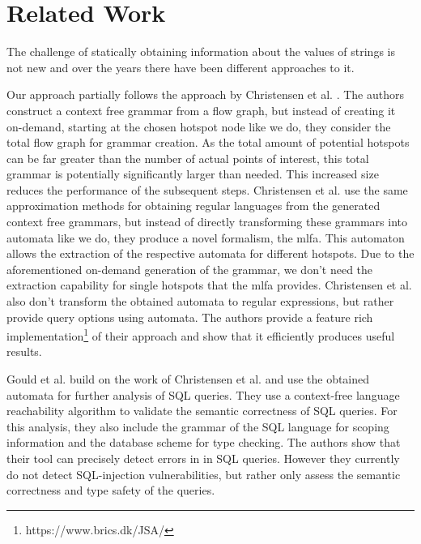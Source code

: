 \chapter{Related Work}
\label{chapter:RelatedWork}

The challenge of statically obtaining information about the values of strings is not new and over the years there have been different approaches to it.

Our approach partially follows the approach by Christensen et al. \cite{brics}. The authors construct a context free grammar from a flow graph, but instead of creating it on-demand, starting at the chosen hotspot node like we do, they consider the total flow graph for grammar creation.
As the total amount of potential hotspots can be far greater than the number of actual points of interest, this total grammar is potentially significantly larger than needed. This increased size reduces the performance of the subsequent steps.
Christensen et al. use the same approximation methods for obtaining regular languages from the generated context free grammars, but instead of directly transforming these grammars into automata like we do, they produce a novel formalism, the \ac{mlfa}.
This automaton allows the extraction of the respective automata for different hotspots. Due to the aforementioned on-demand generation of the grammar, we don't need the extraction capability for single hotspots that the \ac{mlfa} provides. Christensen et al. also don't transform the obtained automata to regular expressions, but rather provide query options using automata.
The authors provide a feature rich implementation\footnote{https://www.brics.dk/JSA/} of their approach and show that it efficiently produces useful results.

Gould et al. \cite{gould2004static} build on the work of Christensen et al. and use the obtained automata for further analysis of SQL queries. They use a context-free language reachability algorithm to validate the semantic correctness of SQL queries. For this analysis, they also include the grammar of the SQL language for scoping information and the database scheme for type checking.
The authors show that their tool can precisely detect errors in in SQL queries. However they currently do not detect SQL-injection vulnerabilities, but rather only assess the semantic correctness and type safety of the queries.

